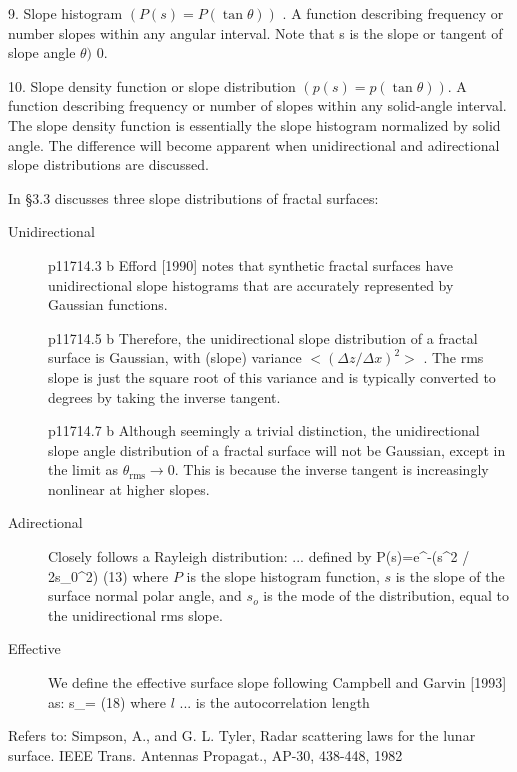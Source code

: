 \documentclass{article}
\begin{document}
9. Slope histogram $(P(s) = P( \tan \theta) )$ . A function describing frequency
or number slopes within any angular interval.  Note that s is the slope or
tangent of slope angle $ \theta) $ 0.

10. Slope density function or slope distribution $(p(s) = p( \tan \theta) )$.  A
function describing frequency or number of slopes within any solid-angle
interval. The slope density function is essentially the slope histogram
normalized by solid angle. The difference will become apparent when
unidirectional and adirectional slope distributions are discussed. \eq 


In \S 3.3 discusses three slope distributions of fractal surfaces:
\begin{description}  %
\item [Unidirectional]  
p11714.3 b \bq Efford [1990] notes that synthetic fractal surfaces have
unidirectional slope histograms that are accurately represented by Gaussian
functions. \eq

p11714.5 b \bq Therefore, the unidirectional slope distribution of a fractal
surface is Gaussian, with (slope) variance $<(\Delta z / \Delta x)^2>$ .  The
rms slope is just the square root of this variance and is typically converted
to degrees by taking the inverse tangent. \eq

p11714.7 b \bq Although seemingly a trivial distinction, the unidirectional
slope angle distribution of a fractal surface will not be Gaussian, except in
the limit as $\theta _\mathrm{rms} \rightarrow 0 $. This is because the inverse
tangent is increasingly nonlinear at higher slopes. \eq

 \item [Adirectional] Closely follows a Rayleigh distribution: 
\bq ... defined by \qb P(s)=e^{-(s^2 / 2s_0^2)} \qeq (13) \qe
where $P$ is the slope histogram function, $s$ is the slope of the surface
normal polar angle, and $s_o$ is the mode of the distribution, equal to the
unidirectional rms slope. \eq

 \item [Effective] \bq We define the effective surface slope following Campbell
and Garvin [1993] as:
\qb s_= \qeq (18) \qe
where $l$ ... is the autocorrelation length \eq

\end{description}

Refers to:  Simpson, A., and G. L. Tyler, Radar scattering laws for the lunar surface. IEEE Trans. Antennas Propagat., AP-30, 438-448, 1982
\end{document}
